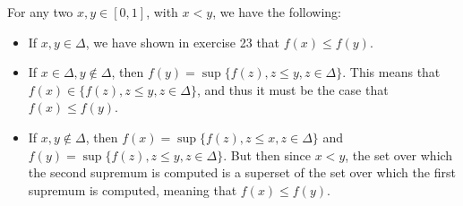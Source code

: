 \begin{solution}
    
    For any two $x, y \in [0, 1]$, with $x < y$, we have the following:
    \begin{itemize}
        \item If $x, y \in \Delta$, we have shown in exercise 23 that $f(x) \leq f(y)$.
        \item If $x \in \Delta, y \notin \Delta$, then  $f(y) = \sup\{f(z), z \leq y, z \in \Delta\}$.
        This means that $f(x) \in \{f(z), z \leq y, z \in \Delta\}$, and thus it must be the case that $f(x) \leq f(y)$.
        \item If $x, y \notin \Delta$, then $f(x) = \sup\{f(z), z \leq x, z \in \Delta\}$ and $f(y) = \sup\{f(z), z \leq y, z \in \Delta\}$.
        But then since $x < y$, the set over which the second supremum is computed is a superset of the set over which the first supremum is computed, meaning that $f(x) \leq f(y)$.
    \end{itemize}
\end{solution}